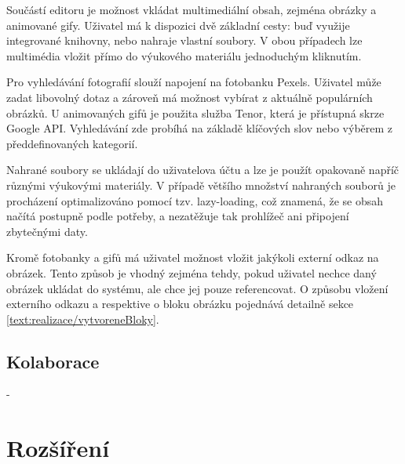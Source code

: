 Součástí editoru je možnost vkládat multimediální obsah, zejména obrázky a animované gify.
Uživatel má k dispozici dvě základní cesty: buď využije integrované knihovny, nebo nahraje vlastní soubory. 
V obou případech lze multimédia vložit přímo do výukového materiálu jednoduchým kliknutím.

Pro vyhledávání fotografií slouží napojení na fotobanku Pexels. 
Uživatel může zadat libovolný dotaz a zároveň má možnost vybírat z aktuálně populárních obrázků. 
U animovaných gifů je použita služba Tenor, která je přístupná skrze Google API. 
Vyhledávání zde probíhá na základě klíčových slov nebo výběrem z předdefinovaných kategorií.

Nahrané soubory se ukládají do uživatelova účtu a lze je použít opakovaně napříč různými výukovými materiály.
V případě většího množství nahraných souborů je procházení optimalizováno pomocí tzv. lazy-loading, což znamená, že se obsah načítá postupně podle potřeby, a nezatěžuje tak prohlížeč ani připojení zbytečnými daty.

Kromě fotobanky a gifů má uživatel možnost vložit jakýkoli externí odkaz na obrázek.
Tento způsob je vhodný zejména tehdy, pokud uživatel nechce daný obrázek ukládat do systému, ale chce jej pouze referencovat. 
O způsobu vložení externího odkazu a respektive o bloku obrázku pojednává detailně sekce \ref{text:realizace/vytvoreneBloky}.



\subsection{Kolaborace}

- 

\section{Rozšíření}


